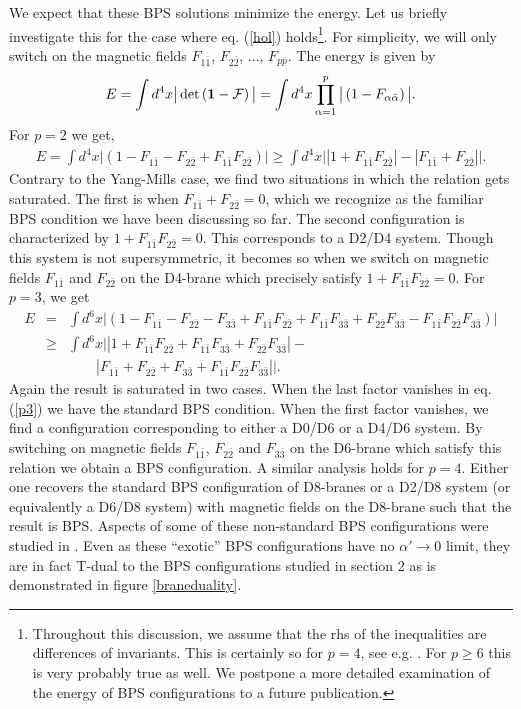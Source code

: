 \documentclass[a4paper,12pt,oneside]{article}
\begin{document}
We expect that these BPS solutions minimize the energy. Let us briefly
investigate this for the case where eq. (\ref{hol})
holds\footnote{Throughout this discussion, we assume that the rhs of the
inequalities are differences of invariants. This is certainly so for
$p=4$, see e.g. \cite{GSW}. For $p\geq 6$ this is very probably true as
well. We postpone a more detailed examination of the energy of BPS
configurations to a future publication.}. 
For simplicity, we will only 
switch on the magnetic fields $F_{1\bar 1}$, $F_{2\bar 2}$, ..., $F_{p\bar 
p}$. The energy is given by
\begin{eqnarray}
E=\int d^4 x \big|\det \left({\bf 1}-{\cal F}\right)\big|  =
\int d^4x \prod_{\alpha =1}^p 
\big| \left(1-F_{\alpha \bar\alpha }\right)\big|.
\end{eqnarray}
For $p=2$ we get,
\begin{eqnarray}
E=\int d^4x\big|\left(1-F_{1\bar 1}- F_{2\bar 2}+F_{1\bar 1}F_{2\bar 2}\right)\big| \geq 
\int d^4 x \big| \left|1+F_{1\bar 1}F_{2\bar 2}\right|-\left|F_{1\bar 1}+ 
F_{2\bar 2} \right|\big|.
\end{eqnarray}
Contrary to the Yang-Mills case, we find two situations in which the relation
gets saturated. The first is when $F_{1\bar 1}+ F_{2\bar 2}=0$, which we 
recognize as the familiar BPS condition we have been discussing so far. 
The second configuration is characterized by $1+F_{1\bar 1}F_{2\bar 2} 
=0$. This corresponds to a D2/D4 system. Though this system is not 
supersymmetric, it becomes so when we switch on magnetic fields $F_{1\bar 1}$ and
$F_{2\bar 2}$ on the 
D4-brane which precisely satisfy $1+F_{1\bar 1}F_{2\bar 2} =0$.
For $p=3$, we get 
\begin{eqnarray}
E&=&\int d^6x\big| \left(1-F_{1\bar 1}- F_{2\bar 2} - F_{3\bar 3} 
+F_{1\bar 1}F_{2\bar 2} +F_{1\bar 1}F_{3\bar 3}+F_{2\bar 2}F_{3\bar 3}
- F_{1\bar 1}F_{2\bar 2}F_{3\bar 3} 
\right)\big| \nonumber\\
&\geq& 
\int d^6x\big| \left|1+F_{1\bar 1}F_{2\bar 2}+F_{1\bar 1}F_{3\bar 3}+F_{2\bar 2}F_{3\bar 3}
\right|-\nonumber\\
&&\qquad\left|F_{1\bar 1}+ F_{2\bar 2} + F_{3\bar 3}+
F_{1\bar 1}F_{2\bar 2}F_{3\bar 3}
\right|\big|.  \label{p3}
\end{eqnarray}  
Again the result is saturated in two cases. When the last factor vanishes 
in eq. (\ref{p3}) we have the standard BPS condition. When the first factor 
vanishes, we find a configuration corresponding to either a D0/D6 or a 
D4/D6 system. By switching on magnetic fields $F_{1\bar 1}$, $F_{2\bar 2}$ 
and $F_{3\bar 3}$ on the D6-brane which satisfy this relation we obtain a 
BPS configuration. 
A similar analysis holds for $p=4$. Either one recovers the standard BPS 
configuration of D8-branes or a D2/D8 system (or equivalently a D6/D8 
system) with magnetic fields on the D8-brane such that the result is BPS.
Aspects of some of these non-standard BPS configurations were studied in
\cite{WittenBPS} .
Even as these ``exotic'' BPS configurations have no $\alpha '\rightarrow 0$
limit, they are in fact T-dual to the BPS configurations studied in section 
2 as is demonstrated in figure \ref{braneduality}. 
\end{document}
